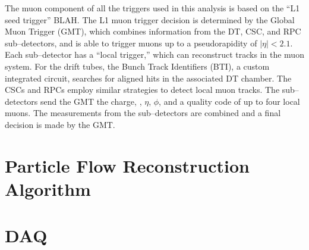 The muon component of all the triggers used in this analysis is based on the
``L1 seed trigger'' BLAH.  The L1 muon trigger decision is
determined by the Global Muon Trigger (GMT), which combines information from the DT,
CSC, and RPC sub--detectors, and is able to trigger muons up to a pseudorapidity
of $|\eta| < 2.1$.  Each sub--detector has a ``local trigger,'' which can
reconstruct tracks in the muon  system.  For the drift tubes, the Bunch Track
Identifiers (BTI), a custom integrated circuit, searches for aligned hits in the
associated DT chamber.  The CSCs and RPCs employ similar strategies to detect
local muon tracks.  The sub--detectors send the GMT the charge, \pt,
$\eta$, $\phi$, and a quality code of up to four local muons.  The 
measurements from the sub--detectors are combined and a final decision is made
by the GMT.

\section{Particle Flow Reconstruction Algorithm}
\section{DAQ}

\ifx\master\undefined\fi
